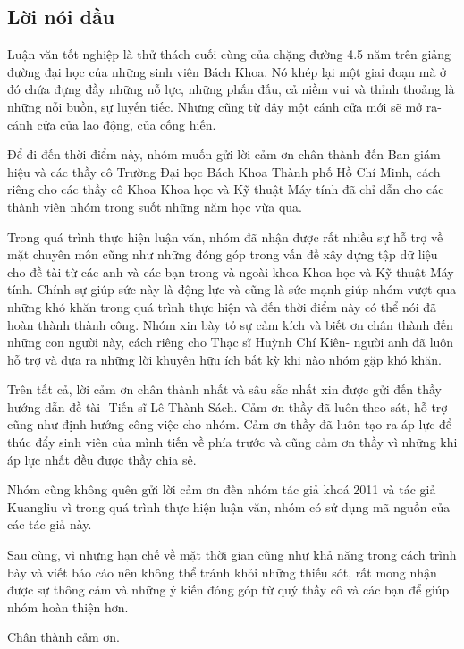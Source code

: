 \documentclass[a4paper,12pt]{article}
\begin{document}
	\newpage 
	\subsection*{Lời nói đầu}
	
	Luận văn tốt nghiệp là thử thách cuối cùng của chặng đường 4.5 năm trên giảng đường đại học của những sinh viên Bách Khoa. Nó khép lại một giai đoạn mà ở đó chứa đựng đầy những nỗ lực, những phấn đấu, cả niềm vui và thỉnh thoảng là những nỗi buồn, sự luyến tiếc. Nhưng cũng từ đây một cánh cửa mới sẽ mở ra- cánh cửa của lao động, của cống hiến. 
	
	Để đi đến thời điểm này, nhóm muốn gửi lời cảm ơn chân thành đến Ban giám hiệu và các thầy cô Trường Đại học Bách Khoa Thành phố Hồ Chí Minh, cách riêng cho các thầy cô Khoa Khoa học và Kỹ thuật Máy tính đã chỉ dẫn cho các thành viên nhóm trong suốt những năm học vừa qua.
	
	Trong quá trình thực hiện luận văn, nhóm đã nhận được rất nhiều sự hỗ trợ về mặt chuyên môn cũng như những đóng góp trong vấn đề xây dựng tập dữ liệu cho đề tài từ các anh và các bạn trong và ngoài khoa Khoa học và Kỹ thuật Máy tính. Chính sự giúp sức này là động lực và cũng là sức mạnh giúp nhóm vượt qua những khó khăn trong quá trình thực hiện và đến thời điểm này có thể nói đã hoàn thành thành công. Nhóm xin bày tỏ sự cảm kích và biết ơn chân thành đến những con người này, cách riêng cho Thạc sĩ Huỳnh Chí Kiên- người anh đã luôn hỗ trợ và đưa ra những lời khuyên hữu ích bất kỳ khi nào nhóm gặp khó khăn. 
	
	Trên tất cả, lời cảm ơn chân thành nhất và sâu sắc nhất xin được gửi đến thầy hướng dẫn đề tài- Tiến sĩ Lê Thành Sách. Cảm ơn thầy đã luôn theo sát, hỗ trợ cũng như định hướng công việc cho nhóm. Cảm ơn thầy đã luôn tạo ra áp lực để thúc đẩy sinh viên của mình tiến về phía trước và cũng cảm ơn thầy vì những khi áp lực nhất đều được thầy chia sẻ. 
	
	Nhóm cũng không quên gửi lời cảm ơn đến nhóm tác giả khoá 2011\cite{qak} và tác giả Kuangliu\cite{github} vì trong quá trình thực hiện luận văn, nhóm có sử dụng mã nguồn của các tác giả này.
	
	Sau cùng, vì những hạn chế về mặt thời gian cũng như khả năng trong cách trình bày và viết báo cáo nên không thể tránh khỏi những thiếu sót, rất mong nhận được sự thông cảm và những ý kiến đóng góp từ quý thầy cô và các bạn để giúp nhóm hoàn thiện hơn.
	
	Chân thành cảm ơn.
	
\end{document}
